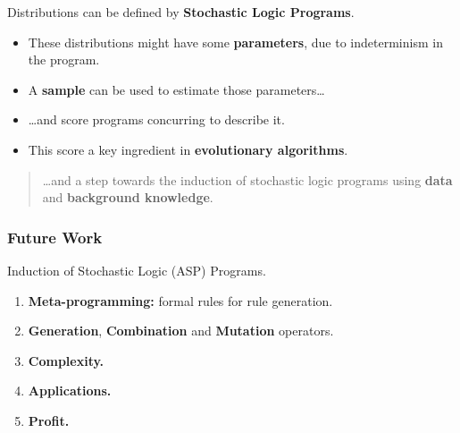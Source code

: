\documentclass[bigger]{beamer}
\begin{document}
%
\begin{frame}
    Distributions can be defined by \textbf{Stochastic Logic Programs}.

    \vfill
    \begin{itemize}
        \item These distributions might have some \textbf{parameters}, due to indeterminism in the program.
        \item A \textbf{sample} can be used to estimate those parameters\ldots
        \item \ldots and \alert{score} programs concurring to describe it.
        \item This score a key ingredient in \textbf{evolutionary algorithms}.
    \end{itemize}

    \vfill
    \begin{quotation}
        \ldots and a step towards the \alert{induction of stochastic logic programs} using \textbf{data} and \textbf{background knowledge}.
    \end{quotation}
\end{frame}
%
\begin{frame}
    \frametitle{Future Work}
    \vfill
    \begin{center}
        Induction of Stochastic Logic (ASP) Programs.
    \end{center}
    \vfill
    \begin{enumerate}
        \item \textbf{Meta-programming:} formal rules for rule generation.
        \item \textbf{Generation}, \textbf{Combination} and \textbf{Mutation} operators.
        \item \textbf{Complexity.}
        \item \textbf{Applications.}
        \item \textbf{Profit.}
    \end{enumerate}
    \vfill
\end{frame}
\end{document}
